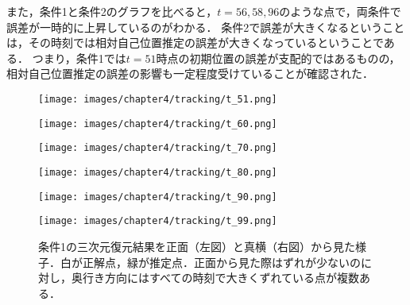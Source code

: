 また，条件1と条件2のグラフを比べると，$t=56, 58, 96$のような点で，両条件で誤差が一時的に上昇しているのがわかる．
条件2で誤差が大きくなるということは，その時刻では相対自己位置推定の誤差が大きくなっているということである．
つまり，条件1では$t=51$時点の初期位置の誤差が支配的ではあるものの，相対自己位置推定の誤差の影響も一定程度受けていることが確認された．

\begin{figure}[h]
	\centering
	\begin{minipage}[t]{0.45\linewidth}
		\centering
		\texttt{[image: images/chapter4/tracking/t\_51.png]}
		\label{fig:tracking_t51}
	\end{minipage}
	\begin{minipage}[t]{0.45\linewidth}
		\centering
		\texttt{[image: images/chapter4/tracking/t\_60.png]}
		\label{fig:tracking_t60}
	\end{minipage}
	\begin{minipage}[t]{0.45\linewidth}
		\centering
		\texttt{[image: images/chapter4/tracking/t\_70.png]}
		\label{fig:tracking_t70}
	\end{minipage}
	\begin{minipage}[t]{0.45\linewidth}
		\centering
		\texttt{[image: images/chapter4/tracking/t\_80.png]}
		\label{fig:tracking_t80}
	\end{minipage}
	\begin{minipage}[t]{0.45\linewidth}
		\centering
		\texttt{[image: images/chapter4/tracking/t\_90.png]}
		\label{fig:tracking_t90}
	\end{minipage}
	\begin{minipage}[t]{0.45\linewidth}
		\centering
		\texttt{[image: images/chapter4/tracking/t\_99.png]}
		\label{fig:tracking_t99}
	\end{minipage}
	\caption[条件1の三次元復元結果を二つの視点から見た様子]{条件1の三次元復元結果を正面（左図）と真横（右図）から見た様子．白が正解点，緑が推定点．正面から見た際はずれが少ないのに対し，奥行き方向にはすべての時刻で大きくずれている点が複数ある．}
	\label{fig:slam_tracking_jouken1}
\end{figure}

